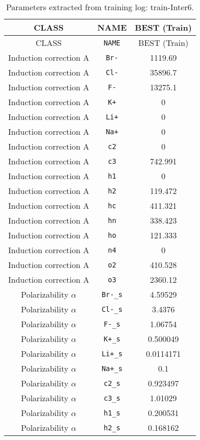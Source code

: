 \begin{table}[ht]
\caption{Parameters extracted from training log: train-Inter6.}
\begin{tabular}{|c|c|c|}
\hline
CLASS & NAME & BEST (Train) \\ 
\hline
CLASS & \verb^NAME^ & BEST (Train) \\ 
Induction correction A & \verb^Br-^ & 1119.69 \\ 
Induction correction A & \verb^Cl-^ & 35896.7 \\ 
Induction correction A & \verb^F-^ & 13275.1 \\ 
Induction correction A & \verb^K+^ & 0 \\ 
Induction correction A & \verb^Li+^ & 0 \\ 
Induction correction A & \verb^Na+^ & 0 \\ 
Induction correction A & \verb^c2^ & 0 \\ 
Induction correction A & \verb^c3^ & 742.991 \\ 
Induction correction A & \verb^h1^ & 0 \\ 
Induction correction A & \verb^h2^ & 119.472 \\ 
Induction correction A & \verb^hc^ & 411.321 \\ 
Induction correction A & \verb^hn^ & 338.423 \\ 
Induction correction A & \verb^ho^ & 121.333 \\ 
Induction correction A & \verb^n4^ & 0 \\ 
Induction correction A & \verb^o2^ & 410.528 \\ 
Induction correction A & \verb^o3^ & 2360.12 \\ 
Polarizability $\alpha$ & \verb^Br-_s^ & 4.59529 \\ 
Polarizability $\alpha$ & \verb^Cl-_s^ & 3.4376 \\ 
Polarizability $\alpha$ & \verb^F-_s^ & 1.06754 \\ 
Polarizability $\alpha$ & \verb^K+_s^ & 0.500049 \\ 
Polarizability $\alpha$ & \verb^Li+_s^ & 0.0114171 \\ 
Polarizability $\alpha$ & \verb^Na+_s^ & 0.1 \\ 
Polarizability $\alpha$ & \verb^c2_s^ & 0.923497 \\ 
Polarizability $\alpha$ & \verb^c3_s^ & 1.01029 \\ 
Polarizability $\alpha$ & \verb^h1_s^ & 0.200531 \\ 
Polarizability $\alpha$ & \verb^h2_s^ & 0.168162 \\ 

\end{tabular}
\end{table}
